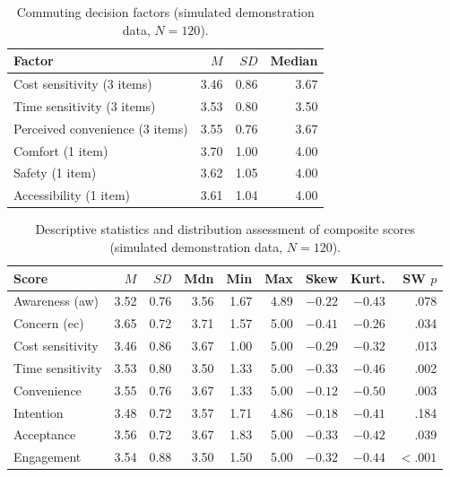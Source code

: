 \documentclass[11pt,a4paper]{article}
\begin{document}
\begin{table}[H]
\centering
\small
\caption{Commuting decision factors (simulated demonstration data, $N = 120$).}
\label{tab:factors}
\begin{tabular}{@{}lrrr@{}}
\toprule
\textbf{Factor} & \textbf{$M$} & \textbf{$SD$} & \textbf{Median}\\
\midrule
Cost sensitivity (3 items) & 3.46 & 0.86 & 3.67\\
Time sensitivity (3 items) & 3.53 & 0.80 & 3.50\\
Perceived convenience (3 items) & 3.55 & 0.76 & 3.67\\
Comfort (1 item) & 3.70 & 1.00 & 4.00\\
Safety (1 item) & 3.62 & 1.05 & 4.00\\
Accessibility (1 item) & 3.61 & 1.04 & 4.00\\
\bottomrule
\end{tabular}
\end{table}

\begin{table}[H]
\centering
\small
\caption{Descriptive statistics and distribution assessment of composite scores (simulated
demonstration data, $N = 120$).}
\label{tab:desc}
\begin{tabular}{@{}lrrrrrrrr@{}}
\toprule
\textbf{Score} & \textbf{$M$} & \textbf{$SD$} & \textbf{Mdn} & \textbf{Min} & \textbf{Max} & \textbf{Skew} & \textbf{Kurt.} & \textbf{SW $p$}\\
\midrule
Awareness (aw) & 3.52 & 0.76 & 3.56 & 1.67 & 4.89 & $-0.22$ & $-0.43$ & .078\\
Concern (ec) & 3.65 & 0.72 & 3.71 & 1.57 & 5.00 & $-0.41$ & $-0.26$ & .034\\
Cost sensitivity & 3.46 & 0.86 & 3.67 & 1.00 & 5.00 & $-0.29$ & $-0.32$ & .013\\
Time sensitivity & 3.53 & 0.80 & 3.50 & 1.33 & 5.00 & $-0.33$ & $-0.46$ & .002\\
Convenience & 3.55 & 0.76 & 3.67 & 1.33 & 5.00 & $-0.12$ & $-0.50$ & .003\\
Intention & 3.48 & 0.72 & 3.57 & 1.71 & 4.86 & $-0.18$ & $-0.41$ & .184\\
Acceptance & 3.56 & 0.72 & 3.67 & 1.83 & 5.00 & $-0.33$ & $-0.42$ & .039\\
Engagement & 3.54 & 0.88 & 3.50 & 1.50 & 5.00 & $-0.32$ & $-0.44$ & $<.001$\\
\bottomrule
\end{tabular}
\end{table}
\end{document}
